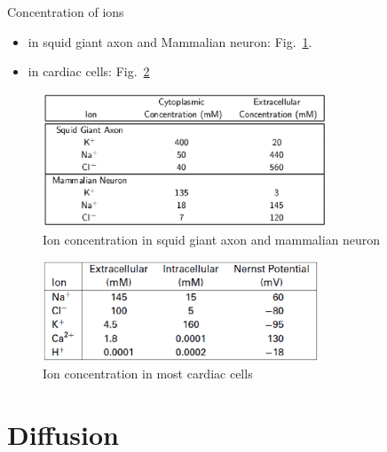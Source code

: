 Concentration of ions 
\begin{itemize}
\item in squid giant axon and Mammalian neuron:
  Fig.~\ref{fig:squid_axon-ion_con}. 
\item in cardiac cells: Fig.~\ref{fig:ion_con_cardiac}
\end{itemize}
\begin{figure}[htb]
  \centerline{\includegraphics[height=4cm]{./images/ion_concentration.eps}}
  \caption{Ion concentration in squid giant axon and mammalian
    neuron}\label{fig:squid_axon-ion_con}
\end{figure}

\begin{figure}[htb]
  \centerline{\includegraphics[height=3cm]{./images/ion_concentration_cardiac.eps}}
  \caption{Ion concentration in most cardiac
    cells}\label{fig:ion_con_cardiac}
\end{figure}


\section{Diffusion}
\label{sec:diffusion-2}

